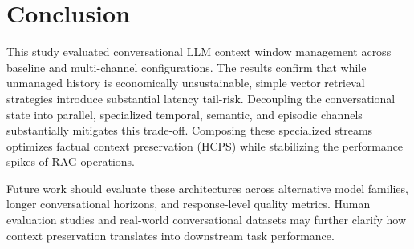 \documentclass[11pt,journal,onecolumn]{article}
\begin{document}
\section{Conclusion}
This study evaluated conversational LLM context window management across baseline and multi-channel configurations. The results confirm that while unmanaged history is economically unsustainable, simple vector retrieval strategies introduce substantial latency tail-risk. Decoupling the conversational state into parallel, specialized temporal, semantic, and episodic channels substantially mitigates this trade-off. Composing these specialized streams optimizes factual context preservation (HCPS) while stabilizing the performance spikes of RAG operations.

Future work should evaluate these architectures across alternative model families, longer conversational horizons, and response-level quality metrics. Human evaluation studies and real-world conversational datasets may further clarify how context preservation translates into downstream task performance.



\end{document}
